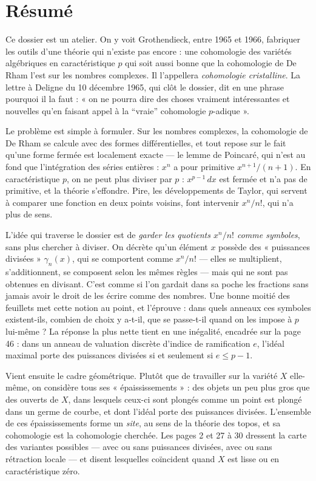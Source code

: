 \documentclass[11pt,a4paper]{article}
\begin{document}
\section*{Résumé}

\begin{resume}
Ce dossier est un atelier. On y voit Grothendieck, entre 1965 et 1966,
fabriquer les outils d'une théorie qui n'existe pas encore : une cohomologie
des variétés algébriques en caractéristique $p$ qui soit aussi bonne que la
cohomologie de De Rham l'est sur les nombres complexes. Il l'appellera
\emph{cohomologie cristalline}. La lettre à Deligne du 10 décembre 1965, qui
clôt le dossier, dit en une phrase pourquoi il la faut : « on ne pourra dire
des choses vraiment intéressantes et nouvelles qu'en faisant appel à la
“vraie” cohomologie $p$-adique ».

Le problème est simple à formuler. Sur les nombres complexes, la cohomologie
de De Rham se calcule avec des formes différentielles, et tout repose sur le
fait qu'une forme fermée est localement exacte — le lemme de Poincaré, qui
n'est au fond que l'intégration des séries entières : $x^{n}$ a pour
primitive $x^{n+1}/(n+1)$. En caractéristique $p$, on ne peut plus diviser
par $p$ : $x^{p-1}\,dx$ est fermée et n'a pas de primitive, et la théorie
s'effondre. Pire, les développements de Taylor, qui servent à comparer une
fonction en deux points voisins, font intervenir $x^{n}/n!$, qui n'a plus de
sens.

L'idée qui traverse le dossier est de \emph{garder les quotients
$x^{n}/n!$ comme symboles}, sans plus chercher à diviser. On décrète qu'un
élément $x$ possède des « puissances divisées » $\gamma_n(x)$, qui se
comportent comme $x^{n}/n!$ — elles se multiplient, s'additionnent,
se composent selon les mêmes règles — mais qui ne sont pas obtenues en
divisant. C'est comme si l'on gardait dans sa poche les fractions sans
jamais avoir le droit de les écrire comme des nombres. Une bonne moitié des
feuillets met cette notion au point, et l'éprouve : dans quels anneaux ces
symboles existent-ils, combien de choix y a-t-il, que se passe-t-il quand
on les impose à $p$ lui-même ? La réponse la plus nette tient en une
inégalité, encadrée sur la page 46 : dans un anneau de valuation discrète
d'indice de ramification $e$, l'idéal maximal porte des puissances divisées
si et seulement si $e \leqslant p-1$.

Vient ensuite le cadre géométrique. Plutôt que de travailler sur la variété
$X$ elle-même, on considère tous ses « épaississements » : des objets un peu
plus gros que des ouverts de $X$, dans lesquels ceux-ci sont plongés comme
un point est plongé dans un germe de courbe, et dont l'idéal porte des
puissances divisées. L'ensemble de ces épaississements forme un \emph{site},
au sens de la théorie des topos, et sa cohomologie est la cohomologie
cherchée. Les pages 2 et 27 à 30 dressent la carte des variantes possibles
— avec ou sans puissances divisées, avec ou sans rétraction locale — et
disent lesquelles coïncident quand $X$ est lisse ou en caractéristique zéro.


\end{resume}
\end{document}

